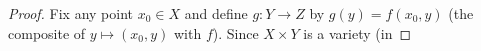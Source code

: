 \begin{proof}
\leanok
  Fix any point \(x_0 \in X\) and define \(g \colon Y \to Z\) by \(g(y) = f(x_0, y)\) (the
  composite of \(y \mapsto (x_0, y)\) with \(f\)). Since \(X \times Y\) is a variety (in

\end{proof}
